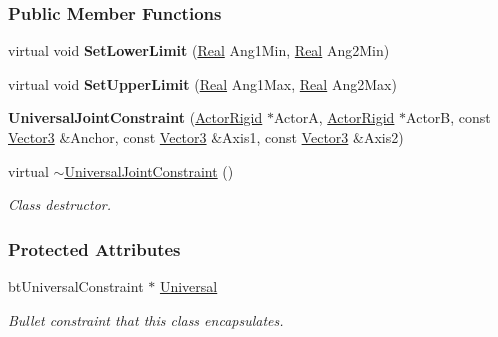 \subsubsection*{Public Member Functions}
\begin{DoxyCompactItemize}
\item 
\hypertarget{classMezzanine_1_1UniversalJointConstraint_a297c78051c93fbcbaf0d24a9030a4306}{
virtual void {\bfseries SetLowerLimit} (\hyperlink{namespaceMezzanine_a726731b1a7df72bf3583e4a97282c6f6}{Real} Ang1Min, \hyperlink{namespaceMezzanine_a726731b1a7df72bf3583e4a97282c6f6}{Real} Ang2Min)}
\label{classMezzanine_1_1UniversalJointConstraint_a297c78051c93fbcbaf0d24a9030a4306}

\item 
\hypertarget{classMezzanine_1_1UniversalJointConstraint_aa5d0ac22ca65ba13e82d827f89283ba6}{
virtual void {\bfseries SetUpperLimit} (\hyperlink{namespaceMezzanine_a726731b1a7df72bf3583e4a97282c6f6}{Real} Ang1Max, \hyperlink{namespaceMezzanine_a726731b1a7df72bf3583e4a97282c6f6}{Real} Ang2Max)}
\label{classMezzanine_1_1UniversalJointConstraint_aa5d0ac22ca65ba13e82d827f89283ba6}

\item 
\hypertarget{classMezzanine_1_1UniversalJointConstraint_a6f32c739e1325b12c5e6b1b943f9873e}{
{\bfseries UniversalJointConstraint} (\hyperlink{classMezzanine_1_1ActorRigid}{ActorRigid} $\ast$ActorA, \hyperlink{classMezzanine_1_1ActorRigid}{ActorRigid} $\ast$ActorB, const \hyperlink{classMezzanine_1_1Vector3}{Vector3} \&Anchor, const \hyperlink{classMezzanine_1_1Vector3}{Vector3} \&Axis1, const \hyperlink{classMezzanine_1_1Vector3}{Vector3} \&Axis2)}
\label{classMezzanine_1_1UniversalJointConstraint_a6f32c739e1325b12c5e6b1b943f9873e}

\item 
virtual \hyperlink{classMezzanine_1_1UniversalJointConstraint_a2e6d0ee965247873976fa16f2e425feb}{$\sim$UniversalJointConstraint} ()
\begin{DoxyCompactList}\small\item\em Class destructor. \item\end{DoxyCompactList}\end{DoxyCompactItemize}
\subsubsection*{Protected Attributes}
\begin{DoxyCompactItemize}
\item 
\hypertarget{classMezzanine_1_1UniversalJointConstraint_a30a26e23a0ff9b01212818ee9bc3a0c7}{
btUniversalConstraint $\ast$ \hyperlink{classMezzanine_1_1UniversalJointConstraint_a30a26e23a0ff9b01212818ee9bc3a0c7}{Universal}}
\label{classMezzanine_1_1UniversalJointConstraint_a30a26e23a0ff9b01212818ee9bc3a0c7}

\begin{DoxyCompactList}\small\item\em Bullet constraint that this class encapsulates. \item\end{DoxyCompactList}\end{DoxyCompactItemize}


